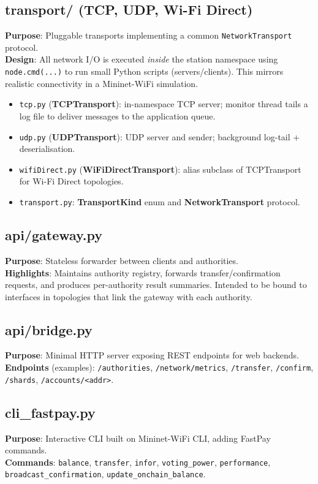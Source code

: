 \documentclass[11pt,a4paper]{article}
\begin{document}
\subsection{transport/ (TCP, UDP, Wi-Fi Direct)}
\textbf{Purpose}: Pluggable transports implementing a common \texttt{NetworkTransport} protocol.\\
\textbf{Design}: All network I/O is executed \emph{inside} the station namespace using \texttt{node.cmd(...)} to run small Python scripts (servers/clients). This mirrors realistic connectivity in a Mininet-WiFi simulation.
\begin{itemize}[noitemsep]
  \item \texttt{tcp.py} (\textbf{TCPTransport}): in-namespace TCP server; monitor thread tails a log file to deliver messages to the application queue.
  \item \texttt{udp.py} (\textbf{UDPTransport}): UDP server and sender; background log-tail + deserialisation.
  \item \texttt{wifiDirect.py} (\textbf{WiFiDirectTransport}): alias subclass of TCPTransport for Wi-Fi Direct topologies.
  \item \texttt{transport.py}: \textbf{TransportKind} enum and \textbf{NetworkTransport} protocol.
\end{itemize}

\subsection{api/gateway.py}
\textbf{Purpose}: Stateless forwarder between clients and authorities.\\
\textbf{Highlights}: Maintains authority registry, forwards transfer/confirmation requests, and produces per-authority result summaries. Intended to be bound to interfaces in topologies that link the gateway with each authority.

\subsection{api/bridge.py}
\textbf{Purpose}: Minimal HTTP server exposing REST endpoints for web backends.\\
\textbf{Endpoints} (examples): \texttt{/authorities}, \texttt{/network/metrics}, \texttt{/transfer}, \texttt{/confirm}, \texttt{/shards}, \texttt{/accounts/<addr>}.

\subsection{cli\_fastpay.py}
\textbf{Purpose}: Interactive CLI built on Mininet-WiFi CLI, adding FastPay commands.\\
\textbf{Commands}: \texttt{balance}, \texttt{transfer}, \texttt{infor}, \texttt{voting\_power}, \texttt{performance}, \texttt{broadcast\_confirmation}, \texttt{update\_onchain\_balance}.
\end{document}
